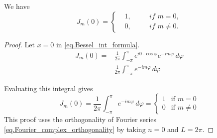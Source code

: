 \begin{lemma}[] We have
\begin{equation}\label{eq.Bessel_value_at_zero}
    J_m(0) = \left\{\begin{aligned}
    &1,\quad &&\textit{if } m = 0,
    \\
    &0, &&\textit{if } m \neq 0.
\end{aligned}
\right.
\end{equation}
\end{lemma}
\begin{proof}
Let $x = 0$ in \eqref{eq.Bessel_int_formula}. 
\begin{equation}\label{eq.proof_Bessel_value_at_zero_1}
    \begin{split}
    J_m(0) =& \frac{1}{2\pi} \int_{-\pi}^{\pi} e^{i0 \cdot \cos \varphi} e^{-im \varphi} \, d\varphi
    \\
    =& \frac{1}{2\pi} \int_{-\pi}^{\pi} e^{-im \varphi} \, d\varphi
    \end{split}
\end{equation}

Evaluating this integral gives
\begin{equation}\label{eq.proof_Bessel_value_at_zero_2}
    J_m(0)=\frac{1}{2\pi} \int_{-\pi}^{\pi} e^{-im \varphi} \, d\varphi= 
    \begin{cases} 
    1 & \text{if } m = 0 \\ 
    0 & \text{if } m \neq 0 
    \end{cases}
\end{equation}
This proof uses the orthogonality of Fourier series \eqref{eq.Fourier_complex_orthogonality} by taking $n = 0$ and $L = 2\pi$.
\end{proof}

